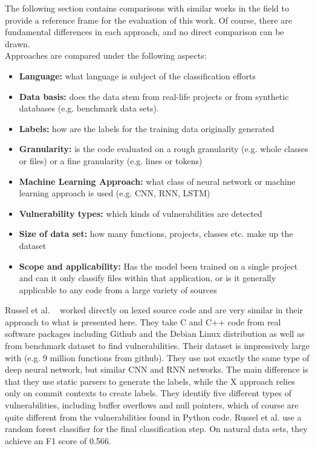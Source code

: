 \documentclass[
	a4paper,
	pagesize,
	pdftex,
	12pt,
	twoside, %
	BCOR=5mm, %
	ngerman,
	fleqn,
	final,
	]{scrartcl}
\begin{document}
The following section contains comparisons with similar works in the field to provide a reference frame for the evaluation of this work. Of course, there are fundamental differences in each approach, and no direct comparison can be drawn.\\
Approaches are compared under the following aspects:\\
\begin{itemize}
	\item \textbf{Language:} what language is subject of the classification efforts
	\item \textbf{Data basis:} does the data stem from real-life projects or from synthetic databases (e.g. benchmark data sets).
	\item \textbf{Labels:} how are the labels for the training data originally generated
	\item \textbf{Granularity:} is the code evaluated on a rough granularity (e.g. whole classes or files) or a fine granularity (e.g. lines or tokens)
	\item \textbf{Machine Learning Approach:} what class of neural network or machine learning approach is used (e.g. CNN, RNN, LSTM)
	\item \textbf{Vulnerability types:} which kinds of vulnerabilities are detected
	\item \textbf{Size of data set:} how many functions, projects, classes etc. make up the dataset
	\item \textbf{Scope and applicability:} Has the model been trained on a single project and can it only classify files within that application, or is it generally applicable to any code from a large variety of sources
\end{itemize}


Russel et al. ~\cite{Russell.2018} worked directly on lexed source code and are very similar in their approach to what is presented here. They take C and C++ code from real software packages including Github and the Debian Linux distribution as well as from benchmark dataset to find vulnerabilities. Their dataset is impressively large with (e.g. 9 million functions from github). They use not exactly the same type of deep neural network, but similar CNN and RNN networks. The main difference is that they use static parsers to generate the labels, while the X approach relies only on commit contexts to create labels. They identify five different types of vulnerabilities, including buffer overflows and null pointers, which of course are quite different from the vulnerabilities found in Python code. Russel et al. use a random forest classifier for the final classification step. On natural data sets, they achieve an F1 score of 0.566.\\
\end{document}
